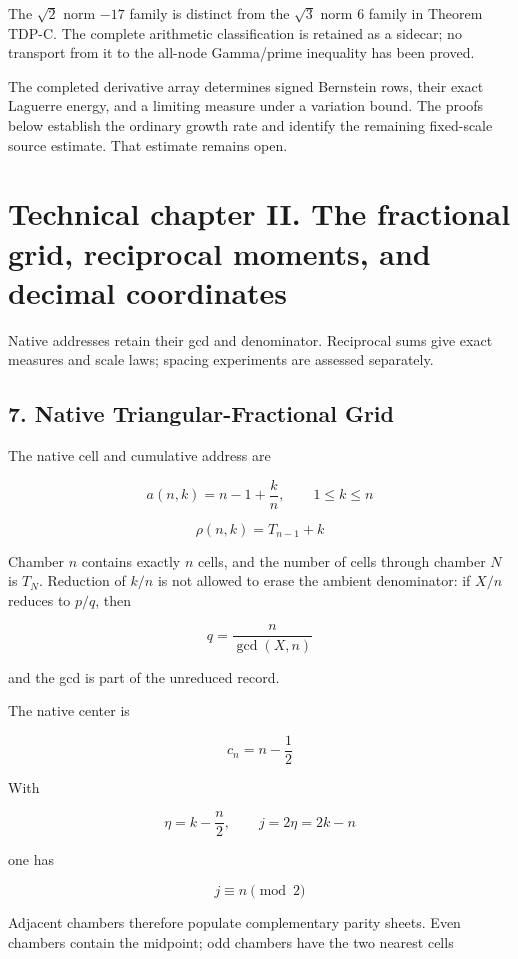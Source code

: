 \documentclass[
  11pt,
]{book}
\begin{document}
The \(\sqrt2\) norm \(-17\) family is distinct from the \(\sqrt3\) norm
6 family in Theorem TDP-C. The complete arithmetic classification is
retained as a sidecar; no transport from it to the all-node Gamma/prime
inequality has been proved.

The completed derivative array determines signed Bernstein rows, their
exact Laguerre energy, and a limiting measure under a variation bound.
The proofs below establish the ordinary growth rate and identify the
remaining fixed-scale source estimate. That estimate remains open.


\chapter{Technical chapter II. The fractional grid, reciprocal moments,
and decimal
coordinates}\label{technical-chapter-ii.-the-fractional-grid-reciprocal-moments-and-decimal-coordinates}

Native addresses retain their gcd and denominator. Reciprocal sums give
exact measures and scale laws; spacing experiments are assessed
separately.

\section{7. Native Triangular-Fractional
Grid}\label{native-triangular-fractional-grid}

The native cell and cumulative address are

\[
a(n,k)=n-1+\frac{k}{n},\qquad 1\le k\le n
\]

\[
\rho(n,k)=T_{n-1}+k
\]

Chamber \(n\) contains exactly \(n\) cells, and the number of cells
through chamber \(N\) is \(T_N\). Reduction of \(k/n\) is not allowed to
erase the ambient denominator: if \(X/n\) reduces to \(p/q\), then

\[
q=\frac n{\gcd(X,n)}
\]

and the gcd is part of the unreduced record.

The native center is

\[
c_n=n-\frac12
\]

With

\[
\eta=k-\frac n2,\qquad j=2\eta=2k-n
\]

one has

\[
\boxed{j\equiv n\pmod2}
\]

Adjacent chambers therefore populate complementary parity sheets. Even
chambers contain the midpoint; odd chambers have the two nearest cells
\end{document}

